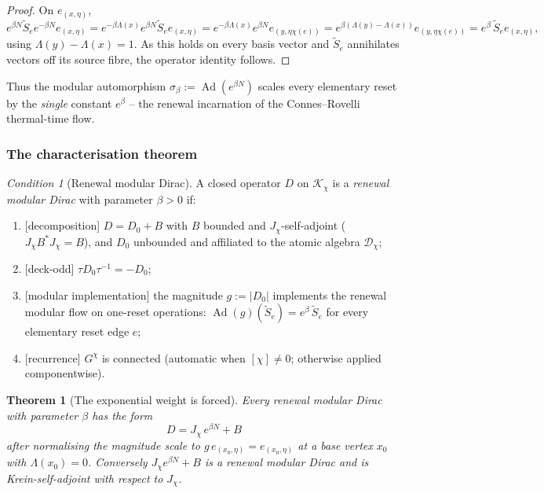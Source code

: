 \documentclass[11pt]{article}
\newtheorem{theorem}{Theorem}[section]
\theoremstyle{definition}
\theoremstyle{remark}
\newcommand{\Kh}{\mathcal{K}}
\newcommand{\Dd}{\mathcal{D}}
\newtheorem{axiom}{Condition}[section]
\newcommand{\Ad}{\operatorname{Ad}}
\newcommand{\Jchi}{J_\chi}
\newcommand{\Stilde}{\widetilde{S}}
\begin{document}
\begin{proof}
On $e_{(x,\eta)}$,
\[
  e^{\beta N}\Stilde_e e^{-\beta N}e_{(x,\eta)}
  =e^{-\beta\Lambda(x)}e^{\beta N}\Stilde_e e_{(x,\eta)}
  =e^{-\beta\Lambda(x)}e^{\beta N}e_{(y,\eta\chi(e))}
  =e^{\beta(\Lambda(y)-\Lambda(x))}e_{(y,\eta\chi(e))}
  =e^{\beta}\,\Stilde_e e_{(x,\eta)},
\]
using $\Lambda(y)-\Lambda(x)=1$.  As this holds on every basis vector and
$\Stilde_e$ annihilates vectors off its source fibre, the operator identity
follows.
\end{proof}

Thus the modular automorphism $\sigma_\beta:=\Ad(e^{\beta N})$ scales every
elementary reset by the \emph{single} constant $e^{\beta}$ -- the renewal
incarnation of the Connes--Rovelli thermal-time flow.

\subsubsection{The characterisation theorem}

\begin{axiom}[Renewal modular Dirac]
\label{ax:modular-dirac}
A closed operator $D$ on $\Kh_\chi$ is a \emph{renewal modular Dirac} with
parameter $\beta>0$ if:
\begin{enumerate}[label=\textup{(M\arabic*)},leftmargin=2.8em]
\item \textup{[decomposition]} $D=D_0+B$ with $B$ bounded and $\Jchi$-self-adjoint
      \textup{(}$\Jchi B^*\Jchi=B$\textup{)}, and $D_0$ unbounded and affiliated to the atomic
      algebra $\Dd_\chi$;
\item \textup{[deck-odd]} $\tau D_0\tau^{-1}=-D_0$;
\item \textup{[modular implementation]} the magnitude $g:=|D_0|$ implements the
      renewal modular flow on one-reset operations:
      $\Ad(g)(\Stilde_e)=e^{\beta}\,\Stilde_e$ for every elementary reset edge $e$;
\item \textup{[recurrence]} $G^\chi$ is connected \textup{(}automatic when
      $[\chi]\neq0$; otherwise applied componentwise\textup{)}.
\end{enumerate}
\end{axiom}

\begin{theorem}[The exponential weight is forced]
\label{thm:modular-characterisation}
Every renewal modular Dirac with parameter $\beta$ has the form
\[
  \boxed{\,D=\Jchi\,e^{\beta N}+B\,}
\]
after normalising the magnitude scale to $g\,e_{(x_0,\eta)}=e_{(x_0,\eta)}$ at a
base vertex $x_0$ with $\Lambda(x_0)=0$.  Conversely $\Jchi e^{\beta N}+B$ is a
renewal modular Dirac and is Krein-self-adjoint with respect to $\Jchi$.
\end{theorem}
\end{document}
